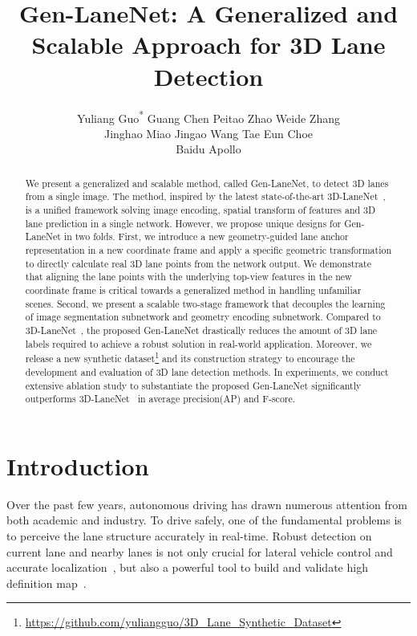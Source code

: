 \documentclass[10pt,twocolumn,letterpaper]{article}
\begin{document}
\title{Gen-LaneNet: A Generalized and Scalable Approach for 3D Lane Detection}

\author{Yuliang Guo\textsuperscript{*} \qquad
Guang Chen \qquad
Peitao Zhao \qquad
Weide Zhang \\
Jinghao Miao \qquad
Jingao Wang \qquad
Tae Eun Choe\\
Baidu Apollo\\
}

\maketitle


\begin{abstract}
We present a generalized and scalable method,  called Gen-LaneNet, to detect 3D lanes from a single image. The method, inspired by the latest state-of-the-art 3D-LaneNet~\cite{Garnett:etal:ICCV2019}, is a unified framework solving image encoding, spatial transform of features and 3D lane prediction in a single network. However, we propose unique designs for Gen-LaneNet in two folds. First, we introduce a new geometry-guided lane anchor representation in a new coordinate frame and apply a specific geometric transformation to directly calculate real 3D lane points from the network output. We demonstrate that aligning the lane points with the underlying top-view features in the new coordinate frame is critical towards a generalized method in handling unfamiliar scenes. Second, we present a scalable two-stage framework that decouples the learning of image segmentation subnetwork and geometry encoding subnetwork. Compared to 3D-LaneNet~\cite{Garnett:etal:ICCV2019}, the proposed Gen-LaneNet drastically reduces the amount of 3D lane labels required to achieve a robust solution in real-world application. Moreover, we release a new synthetic dataset\footnote{\url{https://github.com/yuliangguo/3D_Lane_Synthetic_Dataset}} and its construction strategy to encourage the development and evaluation of 3D lane detection methods. In experiments, we conduct extensive ablation study to substantiate the proposed Gen-LaneNet significantly outperforms 3D-LaneNet~\cite{Garnett:etal:ICCV2019} in average precision(AP) and F-score.
\end{abstract}

\section{Introduction}
\label{sec:intro}

Over the past few years, autonomous driving has drawn numerous attention from both academic and industry. To drive safely, one of the fundamental problems is to perceive the lane structure accurately in real-time. Robust detection on current lane and nearby lanes is not only crucial for lateral vehicle control and accurate localization~\cite{Kogan:etal:ivs2016}, but also a powerful tool to build and validate high definition map~\cite{Homayounfar:etal:CVPR2018}.
\end{document}
